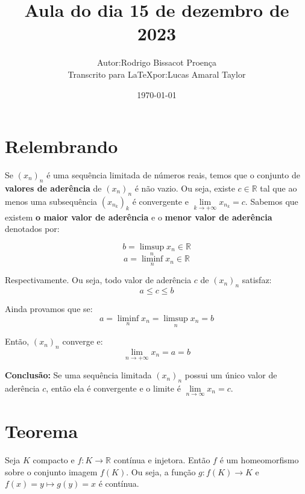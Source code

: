 \documentclass[12pt]{article}
\title{Aula do dia 15 de dezembro de 2023}
\author{
    \begin{tabular}{rl}
        Autor: & Rodrigo Bissacot Proença \\
        Transcrito para \LaTeX por: & Lucas Amaral Taylor
    \end{tabular}
}
\date{\today}
\begin{document}
    \maketitle
    \section*{Relembrando}
     Se $(x_n)_n$ é uma sequência limitada de números reais, temos que o conjunto de \textbf{valores de aderência} de $(x_n)_n$ é não vazio. Ou seja, existe $c \in \mathbb{R}$ tal que ao menos uma subsequência $(x_{n_k})_k$ é convergente e $\lim \limits_{ k \to + \infty} x_{n_k} = c$. Sabemos que existem \textbf{o maior valor de aderência} e o \textbf{menor valor de aderência} denotados por:

    \begin{equation*}
        b = \limsup \limits_{n} x_n \in \mathbb{R}
    \end{equation*}
    \begin{equation*}
        a = \liminf \limits_{n} x_n \in \mathbb{R}
    \end{equation*}


    Respectivamente. Ou seja, todo valor de aderência $c$ de $(x_n)_n$ satisfaz:
    \begin{equation*}
        a \leq c \leq b
    \end{equation*}

    Ainda provamos que se: 
    \begin{equation*}
        a = \liminf \limits_{n} x_n = \limsup \limits_{n} x_n = b    
    \end{equation*}

    Então, $(x_n)_n$ converge e:
    \begin{equation*}
        \lim \limits_{n \to +\infty} x_n = a = b
    \end{equation*}

    \textbf{Conclusão: } Se uma sequência limitada $(x_n)_n$ possui um único valor de aderência $c$, então ela é convergente e o limite é $\lim \limits_{n \to \infty} x_n = c$.
    
    \section*{Teorema}
    Seja $K$ compacto e $f: K \to \mathbb{R}$ contínua e injetora. Então $f$ é um homeomorfismo sobre o conjunto imagem $f(K)$. Ou seja, a função $g: f(K) \to K$ e $f(x) = y \mapsto g(y) = x$ é contínua.
\end{document}
